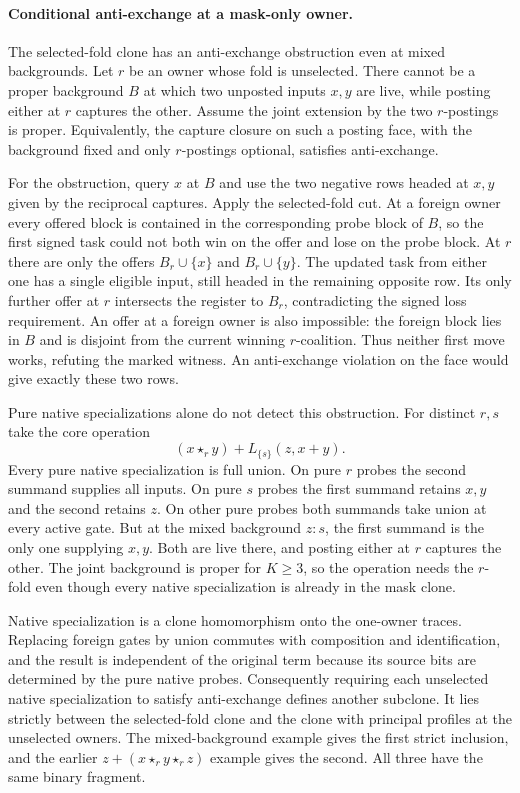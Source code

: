 \paragraph{Conditional anti-exchange at a mask-only owner.}
The selected-fold clone has an anti-exchange obstruction
even at mixed backgrounds. Let $r$ be an owner whose
fold is unselected. There cannot be a proper background
$B$ at which two unposted inputs $x,y$ are live, while
posting either at $r$ captures the other. Assume the
joint extension by the two $r$-postings is proper.
Equivalently, the capture closure on such a posting face,
with the background fixed and only $r$-postings optional,
satisfies anti-exchange.

For the obstruction, query $x$ at $B$ and use the two
negative rows headed at $x,y$ given by the reciprocal
captures. Apply the selected-fold cut. At a foreign owner
every offered block is contained in the corresponding
probe block of $B$, so the first signed task could not
both win on the offer and lose on the probe block.
At $r$ there are only the offers $B_r\cup\{x\}$ and
$B_r\cup\{y\}$. The updated task from either one has a
single eligible input, still headed in the remaining
opposite row. Its only further offer at $r$ intersects
the register to $B_r$, contradicting the signed loss
requirement. An offer at a foreign owner is also impossible:
the foreign block lies in $B$ and is disjoint from the
current winning $r$-coalition. Thus neither first move
works, refuting the marked witness. An anti-exchange
violation on the face would give exactly these two rows.

Pure native specializations alone do not detect this
obstruction. For distinct $r,s$ take the core operation
\[
          (x\star_r y)+L_{\{s\}}(z,x+y).
\]
Every pure native specialization is full union. On
pure $r$ probes the second summand supplies all inputs.
On pure $s$ probes the first summand retains $x,y$ and
the second retains $z$. On other pure probes both
summands take union at every active gate. But at the
mixed background $z:s$, the first summand is the only
one supplying $x,y$. Both are live there, and posting
either at $r$ captures the other. The joint background
is proper for $K\ge3$, so the operation needs the
$r$-fold even though every native specialization is
already in the mask clone.

Native specialization is a clone homomorphism onto the
one-owner traces. Replacing foreign gates by union
commutes with composition and identification, and the
result is independent of the original term because its
source bits are determined by the pure native probes.
Consequently requiring each unselected native
specialization to satisfy anti-exchange defines another
subclone. It lies strictly between the selected-fold
clone and the clone with principal profiles at the
unselected owners. The mixed-background example gives
the first strict inclusion, and the earlier
$z+(x\star_r y\star_r z)$ example gives the second.
All three have the same binary fragment.

